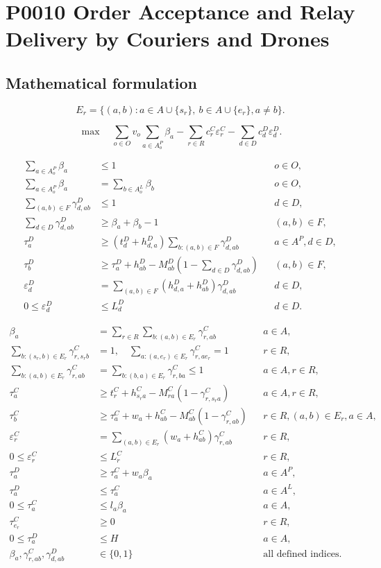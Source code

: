 \documentclass[10pt]{article}
\begin{document}
\section*{P0010 Order Acceptance and Relay Delivery by Couriers and Drones}
\subsection*{Mathematical formulation}
\[
E_r=\{(a,b):a\in A\cup\{s_r\},\ b\in A\cup\{e_r\},a\ne b\}.
\]

\begin{equation}
\max\quad \sum_{o\in O}v_o\sum_{a\in A_o^P}\beta_a-\sum_{r\in R}c_r^C\varepsilon_r^C-\sum_{d\in D}c_d^D\varepsilon_d^D.
\end{equation}

\begin{align}
\sum_{a\in A_o^P}\beta_a&\leq1&&o\in O,\\
\sum_{a\in A_o^P}\beta_a&=\sum_{b\in A_o^L}\beta_b&&o\in O,\\
\sum_{(a,b)\in F}\gamma^D_{d,ab}&\leq1&&d\in D,\\
\sum_{d\in D}\gamma^D_{d,ab}&\geq\beta_a+\beta_b-1&&(a,b)\in F,\\
\tau_a^D&\geq(t_d^D+h_{d,a}^D)\sum_{b:(a,b)\in F}\gamma^D_{d,ab}&&a\in A^P,d\in D,\\
\tau_b^D&\geq\tau_a^D+h_{ab}^D-M_{ab}^D(1-\sum_{d\in D}\gamma^D_{d,ab})&&(a,b)\in F,\\
\varepsilon_d^D&=\sum_{(a,b)\in F}(h_{d,a}^D+h_{ab}^D)\gamma^D_{d,ab}&&d\in D,\\
0\leq\varepsilon_d^D&\leq L_d^D&&d\in D.
\end{align}

\begin{align}
\beta_a&=\sum_{r\in R}\sum_{b:(a,b)\in E_r}\gamma^C_{r,ab}&&a\in A,\\
\sum_{b:(s_r,b)\in E_r}\gamma^C_{r,s_rb}&=1,\quad\sum_{a:(a,e_r)\in E_r}\gamma^C_{r,ae_r}=1&&r\in R,\\
\sum_{b:(a,b)\in E_r}\gamma^C_{r,ab}&=\sum_{b:(b,a)\in E_r}\gamma^C_{r,ba}\leq1&&a\in A,r\in R,\\
\tau_a^C&\geq t_r^C+h_{s_ra}^C-M_{ra}^C(1-\gamma^C_{r,s_ra})&&a\in A,r\in R,\\
\tau_b^C&\geq\tau_a^C+w_a+h_{ab}^C-M_{ab}^C(1-\gamma^C_{r,ab})&&r\in R,(a,b)\in E_r,a\in A,\\
\varepsilon_r^C&=\sum_{(a,b)\in E_r}(w_a+h_{ab}^C)\gamma^C_{r,ab}&&r\in R,\\
0\leq\varepsilon_r^C&\leq L_r^C&&r\in R,\\
\tau_a^D&\geq\tau_a^C+w_a\beta_a&&a\in A^P,\\
\tau_a^D&\leq\tau_a^C&&a\in A^L,\\
0\leq\tau_a^C&\leq l_a\beta_a&&a\in A,\\
\tau_{e_r}^C&\geq0&&r\in R,\\
0\leq\tau_a^D&\leq H&&a\in A,\\
\beta_a,\gamma^C_{r,ab},\gamma^D_{d,ab}&\in\{0,1\}&&\text{all defined indices}.
\end{align}
\end{document}
